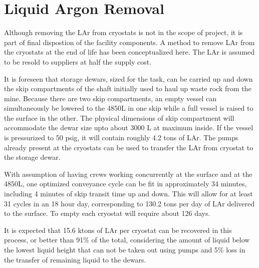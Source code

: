 

\section{Liquid Argon Removal}
\label{sec:liquid-argon-removal}
 
Although removing the LAr from cryostats is not in the scope of project, it is part of final 
dispostion of the facility components. A method to remove LAr from the cryostats at the end 
of life has been conceptualized here. The LAr is assumed to be resold to suppliers at half 
the supply cost.
 
It is foreseen that storage dewars, sized for the task, can be carried up and down the skip 
compartments of the shaft initially used to haul up waste rock from the mine. Because there 
are two skip compartments, an empty vessel can simultaneously be lowered to the 4850L in one 
skip while a full vessel is raised to the surface in the other. The physical dimensions of 
skip compartment will accommodate the dewar size upto about 3000 L at maximum inside. If 
the vessel is pressurized to 50 psig, it will contain roughly 4.2 tons of LAr. The pumps 
already present at the cryostats can be used to transfer the LAr from cryostat to the 
storage dewar.
 
With assumption of having crews working concurrently at the surface and at the 4850L, one 
optimized conveyance cycle can be fit in approximately 34 minutes, including 4 minutes of 
skip transit time up and down. This will allow for at least 31 cycles in an 18 hour day, 
corresponding to 130.2 tons per day of LAr delivered to the surface. To empty each 
cryostat will require about 126 days.
 
It is expected that 15.6 ktons of LAr per cryostat can be recovered in this process, or 
better than 91\% of the total, considering the amount of liquid below the lowest liquid 
height that can not be taken out using pumps and 5\% loss in the transfer of remaining 
liquid to the dewars.

